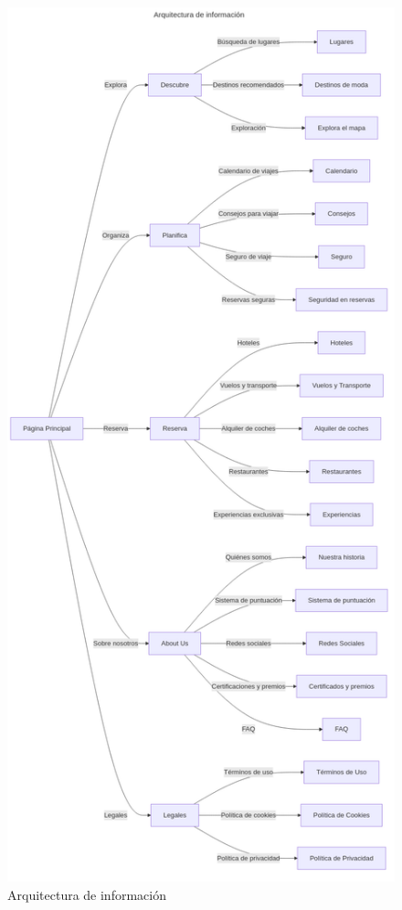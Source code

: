 \documentclass[11pt, a4paper]{book}
\begin{document}
	\begin{figure} [H]
		\centering
		\includegraphics[height=0.85\textheight]{arquitectura_informacion.png}
		\caption{Arquitectura de información}
	\end{figure}
	
\end{document}
